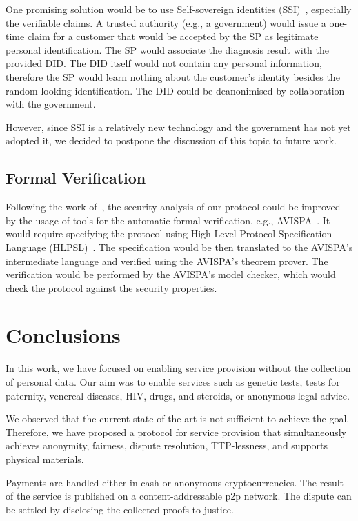 \documentclass[pdftex,twocolumn,epjc3]{svjour3}
\begin{document}
{One promising solution would be to use Self-sovereign identities (SSI)~\cite{muhleSurveyEssentialComponents2018}, especially the verifiable claims. A trusted authority (e.g., a government) would issue a one-time claim for a customer that would be accepted by the SP as legitimate personal identification. The SP would associate the diagnosis result with the provided DID. The DID itself would not contain any personal information, therefore the SP would learn nothing about the customer's identity besides the random-looking identification. The DID could be deanonimised by collaboration with the government.

However, since SSI is a relatively new technology and the government has not yet adopted it, we decided to postpone the discussion of this topic to future work.

\subsection{Formal Verification}\label{sec:formal-verification}
Following the work of~\cite{birjoveanuFormalVerificationMultiparty2022}, the security analysis of our protocol could be improved by the usage of tools for the automatic formal verification, e.g., AVISPA~\cite{armandoAVISPAToolAutomated2005}. It would require specifying the protocol using High-Level Protocol Specification Language (HLPSL)~\cite{chevalierHighLevelProtocol2004}. The specification would be then translated to the AVISPA's intermediate language and verified using the AVISPA's theorem prover. The verification would be performed by the AVISPA's model checker, which would check the protocol against the security properties.

\section{Conclusions}\label{sec:conclusion}
In this work, we have focused on enabling service provision without the collection of personal data. Our aim was to enable services such as genetic tests, tests for paternity, venereal diseases, HIV, drugs, and steroids, or anonymous legal advice.

We observed that the current state of the art is not sufficient to achieve the goal. Therefore, we have proposed a protocol for service provision that simultaneously achieves anonymity, fairness, dispute resolution, TTP-lessness, and supports physical materials.

Payments are handled either in cash or anonymous cryptocurrencies. The result of the service is published on a content-addressable p2p network. The dispute can be settled by disclosing the collected proofs to justice. 

}
\end{document}
